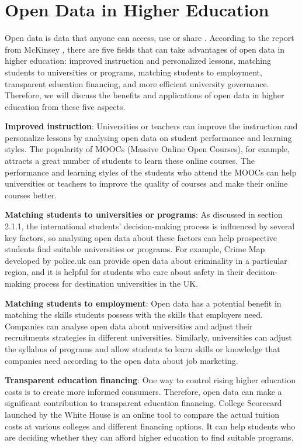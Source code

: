 \section{Open Data in Higher Education 
}

Open data is data that anyone can access, use or share \cite{Open_Data_Institute}. According to the report from McKinsey \cite{McKinsey}, there are five fields that can take advantages of open data in higher education: improved instruction and personalized lessons, matching students to universities or programs, matching students to employment, transparent education financing, and more efficient university governance. Therefore, we will discuss the benefits and applications of open data in higher education from these five aspects.

\textbf{Improved instruction}: Universities or teachers can improve the instruction and personalize lessons by analysing open data on student performance and learning styles. The popularity of MOOCs (Massive Online Open Courses), for example, attracts a great number of students to learn these online courses. The performance and learning styles of the students who attend the MOOCs can help universities or teachers to improve the quality of courses and make their online courses better. 

\textbf{Matching students to universities or programs}: As discussed in section 2.1.1, the international students’ decision-making process is influenced by several key factors, so analysing open data about these factors can help prospective students find suitable universities or programs. For example, Crime Map developed by police.uk can provide open data about criminality in a particular region, and it is helpful for students who care about safety in their decision-making process for destination universities in the UK.

\textbf{Matching students to employment}: Open data has a potential benefit in matching the skills students possess with the skills that employers need. Companies can analyse open data about universities and adjust their recruitments strategies in different universities. Similarly, universities can adjust the syllabus of programs and allow students to learn skills or knowledge that companies need according to the open data about job marketing.

\textbf{Transparent education financing}: One way to control rising higher education costs is to create more informed consumers. Therefore, open data can make a significant contribution to transparent education financing. College Scorecard launched by the White House is an online tool to compare the actual tuition costs at various colleges and different financing options. It can help students who are deciding whether they can afford higher education to find suitable programs.

